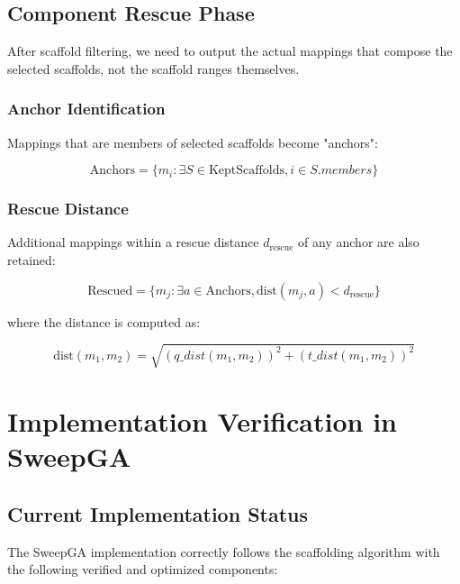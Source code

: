 \documentclass[11pt]{article}
\begin{document}
\subsection{Component Rescue Phase}

After scaffold filtering, we need to output the actual mappings that compose the selected scaffolds, not the scaffold ranges themselves.

\subsubsection{Anchor Identification}

Mappings that are members of selected scaffolds become "anchors":

\begin{equation}
\text{Anchors} = \{m_i : \exists S \in \text{KeptScaffolds}, i \in S.members\}
\end{equation}

\subsubsection{Rescue Distance}

Additional mappings within a rescue distance $d_{\text{rescue}}$ of any anchor are also retained:

\begin{equation}
\text{Rescued} = \{m_j : \exists a \in \text{Anchors}, \text{dist}(m_j, a) < d_{\text{rescue}}\}
\end{equation}

where the distance is computed as:

\begin{equation}
\text{dist}(m_1, m_2) = \sqrt{(q\_dist(m_1, m_2))^2 + (t\_dist(m_1, m_2))^2}
\end{equation}

\section{Implementation Verification in SweepGA}

\subsection{Current Implementation Status}

The SweepGA implementation correctly follows the scaffolding algorithm with the following verified and optimized components:
\end{document}
